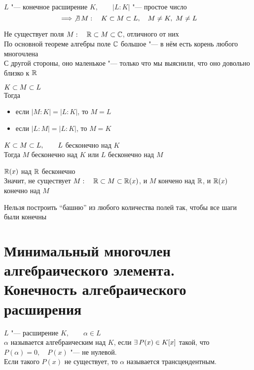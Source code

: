 \begin{implication}
	$ L $ "--- конечное расширение $ K, \qquad |L : K| $ "--- простое число
	$$ \implies \not\exists\, M : \quad K \subset M \subset L, \quad M \ne K, ~ M \ne L $$
\end{implication}

\begin{eg}
	Не существует поля $ M : \quad \mathbb{R} \subset M \subset \mathbb{C} $, отличного от них \\
	По основной теореме алгебры поле $ \mathbb{C} $ большое "--- в нём есть корень любого многочлена \\
	С другой стороны, оно маленькое "--- только что мы выяснили, что оно довольно близко к $ \mathbb{R} $
\end{eg}

\begin{implication}
	$ K \subset M \subset L $ \\
	Тогда
	\begin{itemize}
		\item если $ |M : K| = |L : K| $, то $ M = L $
		\item если $ |L : M| = |L : K| $, то $ M = K $
	\end{itemize}
\end{implication}

\begin{implication}
	$ K \subset M \subset L, \qquad L $ бесконечно над $ K $ \\
	Тогда $ M $ бесконечно над $ K $ или $ L $ бесконечно над $ M $
\end{implication}

\begin{eg}
	$ \mathbb{R}(x) $ над $ \mathbb{R} $ бесконечно \\
	Значит, не существует $ M : \quad \mathbb{R} \subset M \subset \mathbb{R}(x) $, и $ M $ кончено над $ \mathbb{R} $, и $ \mathbb{R}(x) $ конечно над $ M $
\end{eg}

\begin{remark}
	Нельзя построить ``башню'' из любого количества полей так, чтобы все шаги были конечны
\end{remark}

\section{Минимальный многочлен алгебраического элемента. Конечность алгебраического расширения}

\begin{definition}
	$ L $ "--- расширение $ K, \qquad \alpha \in L $ \\
	$ \alpha $ называется алгебраическим над $ K $, если $ \exists\, P(x) \in K[x] $ такой, что $ P(\alpha) = 0, \quad P(x) $ "--- не нулевой. \\
	Если такого $ P(x) $ не существует, то $ \alpha $ называется трансцендентным.
\end{definition}

